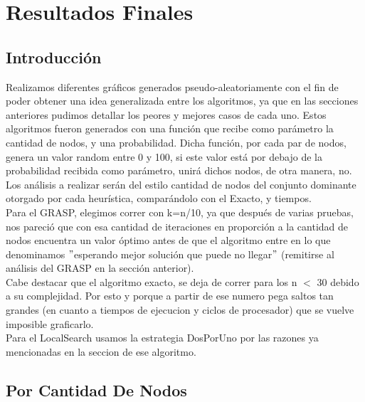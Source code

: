 \section{Resultados Finales}

\subsection{Introducción}

Realizamos diferentes gráficos generados pseudo-aleatoriamente con el fin de poder obtener una idea generalizada entre los algoritmos, ya que en las secciones anteriores pudimos
detallar los peores y mejores casos de cada uno. Estos algoritmos fueron generados con una función que recibe como parámetro la cantidad de nodos, y una probabilidad. Dicha función, por cada par de nodos, genera un valor random entre 0 y 100, si este valor está por debajo de la probabilidad recibida como parámetro, unirá dichos nodos, de otra manera, no.\\
Los análisis a realizar serán del estilo cantidad de nodos del conjunto dominante otorgado por cada heurística, comparándolo con el Exacto, y tiempos.\\
Para el GRASP, elegimos correr con k=n/10, ya que después de varias pruebas, nos pareció que con esa cantidad de iteraciones en proporción a la cantidad de nodos encuentra un valor óptimo antes de que el algoritmo entre en lo que denominamos $"$esperando mejor solución que puede no llegar$"$ (remitirse al análisis del GRASP en la sección anterior).\\
Cabe destacar que el algoritmo exacto, se deja de correr para los n $<$ 30 debido a su complejidad. Por esto y porque a partir de ese numero pega saltos tan grandes (en cuanto a tiempos de ejecucion y ciclos de procesador) que se vuelve imposible graficarlo.\\
Para el LocalSearch usamos la estrategia DosPorUno por las razones ya mencionadas en la seccion de ese algoritmo.\\




\subsection{Por Cantidad De Nodos}

